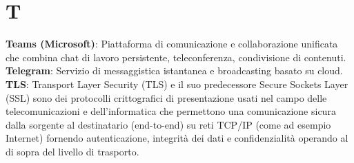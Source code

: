 \section{T}
\textbf{Teams (Microsoft)}: Piattaforma di comunicazione e collaborazione unificata che combina chat di lavoro persistente, teleconferenza, condivisione di contenuti.\\
\textbf{Telegram}: Servizio di messaggistica istantanea e broadcasting basato su cloud.\\
\textbf{TLS}: Transport Layer Security (TLS) e il suo predecessore Secure Sockets Layer (SSL) sono dei protocolli crittografici di presentazione usati nel campo delle telecomunicazioni e
dell'informatica che permettono una comunicazione sicura dalla sorgente al destinatario (end-to-end) su reti TCP/IP (come ad esempio Internet) fornendo autenticazione, 
integrità dei dati e confidenzialità operando al di sopra del livello di trasporto.
